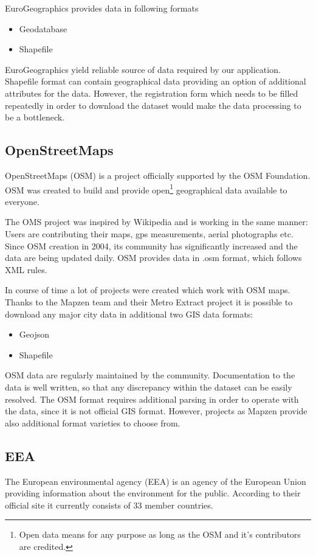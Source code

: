 \documentclass[thesis=M,english]{FITthesis}[2012/10/20]
\begin{document}
EuroGeographics provides data in following formats

\begin{itemize}
\item Geodatabase
\item Shapefile
\end{itemize}

EuroGeographics yield reliable source of data required by our application. Shapefile format can contain geographical data providing an option of additional attributes for the data. However, the registration form which needs to be filled repeatedly in order to download the dataset would make the data processing to be a bottleneck.

\subsection{OpenStreetMaps}
\label{subsec:DA_OSM}
OpenStreetMaps (OSM) is a project officially supported by the OSM Foundation.
OSM was created to build and provide open\footnote{Open data means for any purpose as long as the OSM and it's contributors are credited.} geographical data available to everyone.  

The OMS project was inspired by Wikipedia and is working in the same manner: Users are contributing their maps, gps measurements, aerial photographs etc. Since OSM creation in 2004, its community has significantly increased and the data are being updated daily.
OSM provides data in .osm format, which follows XML rules.

In course of time a lot of projects were created which work with OSM maps.
Thanks to the Mapzen team and their Metro Extract project it is possible to download any major city data in additional two GIS data formats:
\begin{itemize}
\item Geojson
\item Shapefile
\end{itemize}

OSM data are regularly maintained by the community. Documentation to the data is well written, so that any discrepancy within the dataset can be easily resolved. The OSM format requires additional parsing in order to operate with the data, since it is not official GIS format. However, projects as Mapzen provide also additional format varieties to choose from.

\subsection{EEA}
The European environmental agency (EEA) is an agency of the European Union providing information about the environment for the public. According to their official site \cite{EEA16} it currently consists of 33 member countries.
\end{document}
